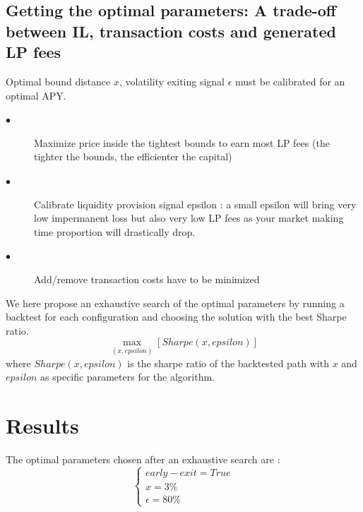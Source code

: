 \documentclass[conference]{IEEEtran}
\begin{document}
\subsection{Getting the optimal parameters: A trade-off between IL, transaction costs and generated LP fees}
Optimal bound distance $x$, volatility exiting signal $\epsilon$ must be calibrated for an optimal APY.
\\
\begin{description}
\item[$\bullet$]Maximize price inside the tightest bounds to earn most LP fees (the tighter the bounds, the efficienter the capital)
\item[$\bullet$]Calibrate liquidity provision signal epsilon : a small epsilon will bring very low impermanent loss but also very low LP fees as your market making time proportion will drastically drop.   \item[$\bullet$] Add/remove transaction costs have to be minimized
\end{description}
We here propose an exhaustive search of the optimal parameters by running a backtest for each configuration and choosing the solution with the best Sharpe ratio.\\
\begin{equation}
\max_{(x, epsilon)} \left[ Sharpe\left(x, epsilon\right)\right]
\end{equation}
where $Sharpe\left(x, epsilon\right)$ is the sharpe ratio of the backtested path with $x$ and $epsilon$ as specific parameters for the algorithm.

\section{Results}\label{result}
The optimal parameters chosen after an exhaustive search are :
\begin{equation}
\left\{\begin{array}{lll}
early-exit = True\\
x = 3\%\\
\epsilon = 80\%
\end{array}
\right.
\end{equation}
\end{document}
